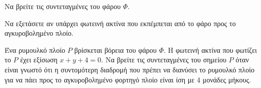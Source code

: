 \begin{alist}
    \item \begin{rlist}
        \item Να βρείτε τις συντεταγμένες του φάρου $\Phi$. 
        \item Να εξετάσετε αν υπάρχει φωτεινή ακτίνα που εκπέμπεται από το φάρο προς το αγκυροβολημένο πλοίο. 
    \end{rlist}
    \item Ένα ρυμουλκό πλοίο $P$ βρίσκεται βόρεια του φάρου $\Phi$. Η φωτεινή ακτίνα που φωτίζει το $P$ έχει εξίσωση $x+y+4=0$. Να βρείτε τις συντεταγμένες του σημείου $P$ όταν είναι γνωστό ότι η συντομότερη διαδρομή που πρέπει να διανύσει το ρυμουλκό πλοίο για να πάει προς το αγκυροβολημένο φορτηγό πλοίο είναι ίση με 4 μονάδες μήκους. 
\end{alist}